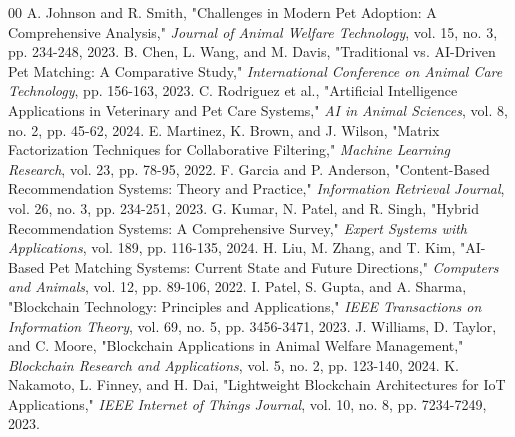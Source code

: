 \documentclass[conference]{IEEEtran}
\begin{document}
\begin{thebibliography}{00}
 A. Johnson and R. Smith, "Challenges in Modern Pet Adoption: A Comprehensive Analysis," \textit{Journal of Animal Welfare Technology}, vol. 15, no. 3, pp. 234-248, 2023.
 B. Chen, L. Wang, and M. Davis, "Traditional vs. AI-Driven Pet Matching: A Comparative Study," \textit{International Conference on Animal Care Technology}, pp. 156-163, 2023.
 C. Rodriguez et al., "Artificial Intelligence Applications in Veterinary and Pet Care Systems," \textit{AI in Animal Sciences}, vol. 8, no. 2, pp. 45-62, 2024.
 E. Martinez, K. Brown, and J. Wilson, "Matrix Factorization Techniques for Collaborative Filtering," \textit{Machine Learning Research}, vol. 23, pp. 78-95, 2022.
 F. Garcia and P. Anderson, "Content-Based Recommendation Systems: Theory and Practice," \textit{Information Retrieval Journal}, vol. 26, no. 3, pp. 234-251, 2023.
 G. Kumar, N. Patel, and R. Singh, "Hybrid Recommendation Systems: A Comprehensive Survey," \textit{Expert Systems with Applications}, vol. 189, pp. 116-135, 2024.
 H. Liu, M. Zhang, and T. Kim, "AI-Based Pet Matching Systems: Current State and Future Directions," \textit{Computers and Animals}, vol. 12, pp. 89-106, 2022.
 I. Patel, S. Gupta, and A. Sharma, "Blockchain Technology: Principles and Applications," \textit{IEEE Transactions on Information Theory}, vol. 69, no. 5, pp. 3456-3471, 2023.
 J. Williams, D. Taylor, and C. Moore, "Blockchain Applications in Animal Welfare Management," \textit{Blockchain Research and Applications}, vol. 5, no. 2, pp. 123-140, 2024.
 K. Nakamoto, L. Finney, and H. Dai, "Lightweight Blockchain Architectures for IoT Applications," \textit{IEEE Internet of Things Journal}, vol. 10, no. 8, pp. 7234-7249, 2023.
\end{thebibliography}
\end{document}
